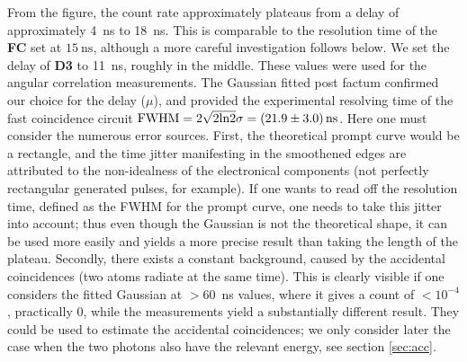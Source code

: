 \documentclass[twocolumn]{article}
\begin{document}
From the figure, the count rate approximately plateaus from a delay of approximately 4~ns to 18~ns. This is comparable to the resolution time of the \textbf{FC} set at $\SI{15}{\nano\second}$, although a more careful investigation follows below. We set the delay of \textbf{D3} to 11~ns, roughly in the middle. These values were used for the angular correlation measurements. The Gaussian fitted post factum confirmed our choice for the delay ($\mu$), and provided the experimental resolving time of the fast coincidence circuit  $\text{FWHM} = 2 \sqrt{2 \text{ln}2} \sigma = \SI[separate-uncertainty = true]{21.9 \pm 3.0}{\nano \second}$.\cite{signal} Here one must consider the numerous error sources. First, the theoretical prompt curve would be a rectangle,\cite{leo} and the time jitter manifesting in the smoothened edges are attributed to the non-idealness of the electronical components (not perfectly rectangular generated pulses, for example). If one wants to read off the resolution time, defined as the FWHM for the prompt curve, one needs to take this jitter into account; thus even though the Gaussian is not the theoretical shape, it can be used more easily and yields a more precise result than taking the length of the plateau. Secondly, there exists a constant background, caused by the accidental coincidences (two atoms radiate at the same time). This is clearly visible if one considers the fitted Gaussian at $>60$~ns values, where it gives a count of $<10^{-4}$, practically 0, while the measurements yield a substantially different result. They could be used to estimate the accidental coincidences; we only consider later the case when the two photons also have the relevant energy, see section \ref{sec:acc}.
\end{document}

